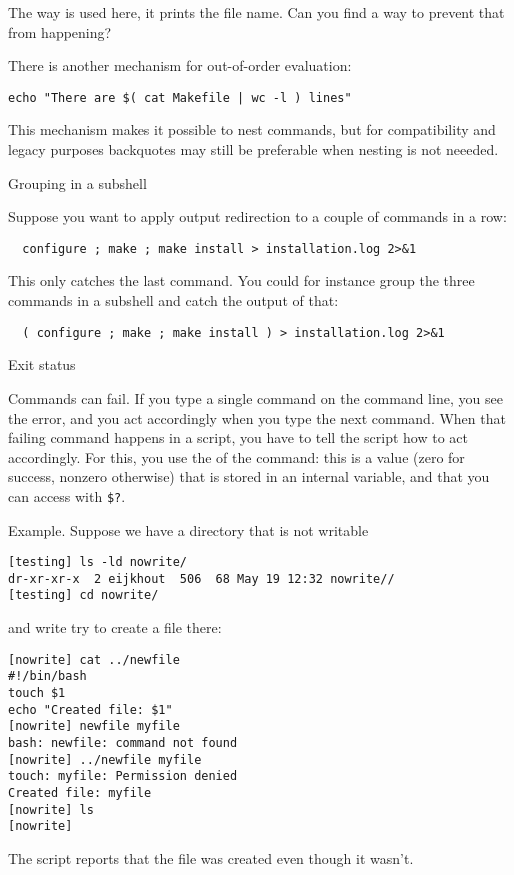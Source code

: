 \begin{exercise}
  The way  is used here, it prints the
  file name. Can you find a way to prevent that from happening?
\end{exercise}

There is another mechanism for
out-of-order evaluation:
\begin{verbatim}
echo "There are $( cat Makefile | wc -l ) lines"
\end{verbatim}
This mechanism makes it possible to nest commands,
but for compatibility and legacy purposes backquotes
may still be preferable when nesting is not neeeded.

 {Grouping in a subshell}

Suppose you want to apply output redirection to a couple of commands
in a row:
\begin{verbatim}
  configure ; make ; make install > installation.log 2>&1
\end{verbatim}
This only catches the last command. You could for instance group the
three commands in a subshell and catch the output of that:
\begin{verbatim}
  ( configure ; make ; make install ) > installation.log 2>&1
\end{verbatim}

 {Exit status}

Commands can fail. If you type a single command on the command line,
you see the error, and you act accordingly when you type the next
command. When that failing command happens in a script, you have to
tell the script how to act accordingly. For this, you use the
 of the command: this is a value (zero for
success, nonzero otherwise) that is stored in an internal variable,
and that you can access with \verb+$?+.

Example. Suppose we have a directory that is not writable
\begin{verbatim}
[testing] ls -ld nowrite/
dr-xr-xr-x  2 eijkhout  506  68 May 19 12:32 nowrite//
[testing] cd nowrite/
\end{verbatim}
and write try to create a file there:
\begin{verbatim}
[nowrite] cat ../newfile 
#!/bin/bash
touch $1
echo "Created file: $1"
[nowrite] newfile myfile
bash: newfile: command not found
[nowrite] ../newfile myfile
touch: myfile: Permission denied
Created file: myfile
[nowrite] ls
[nowrite]
\end{verbatim}
The script reports that the file was created even though it wasn't.

